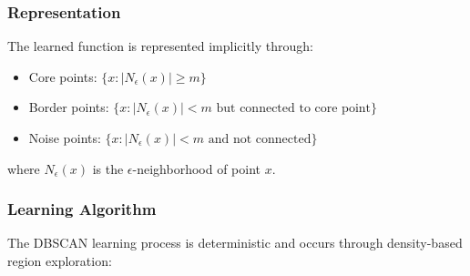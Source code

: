 \documentclass[a4paper, 11pt]{article}
\begin{document}
\subsubsection{Representation}
The learned function is represented implicitly through:
\begin{itemize}
    \item Core points: $\{x: |N_{\epsilon}(x)| \geq m\}$
    \item Border points: $\{x: |N_{\epsilon}(x)| < m \text{ but connected to core point}\}$
    \item Noise points: $\{x: |N_{\epsilon}(x)| < m \text{ and not connected}\}$
\end{itemize}
where $N_{\epsilon}(x)$ is the $\epsilon$-neighborhood of point $x$.

\subsubsection{Learning Algorithm}
The DBSCAN learning process is deterministic and occurs through density-based region exploration:
\end{document}
